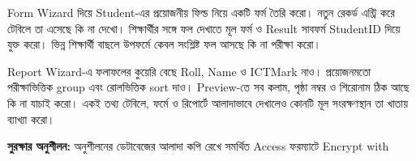 Form Wizard দিয়ে Student-এর প্রয়োজনীয় ফিল্ড নিয়ে একটি ফর্ম তৈরি করো। নতুন রেকর্ড এন্ট্রি করে টেবিলে তা এসেছে কি না দেখো। শিক্ষার্থীর সঙ্গে ফল দেখাতে মূল ফর্ম ও Result সাবফর্ম StudentID দিয়ে যুক্ত করো। ভিন্ন শিক্ষার্থী বাছলে উপফর্মে কেবল সংশ্লিষ্ট ফল আসছে কি না পরীক্ষা করো।

Report Wizard-এ ফলাফলের কুয়েরি বেছে Roll, Name ও ICTMark নাও। প্রয়োজনমতো পরীক্ষাভিত্তিক group এবং রোলভিত্তিক sort দাও। Preview-তে সব কলাম, পৃষ্ঠা নম্বর ও শিরোনাম ঠিক আছে কি না যাচাই করো। একই তথ্য টেবিলে, ফর্মে ও রিপোর্টে আলাদাভাবে দেখালেও কোনটি মূল সংরক্ষণস্থান তা খাতায় ব্যাখ্যা করো।

\textbf{সুরক্ষার অনুশীলন:} অনুশীলনের ডেটাবেজের আলাদা কপি রেখে সমর্থিত Access ফরম্যাটে Encrypt with 